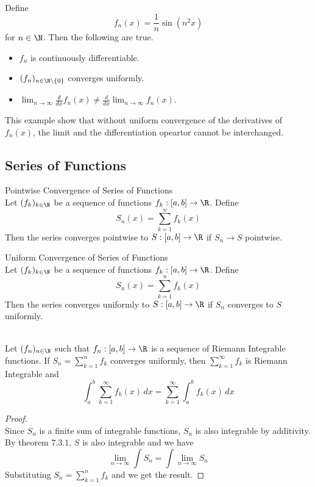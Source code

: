 \documentclass[a4paper]{article}
\begin{document}
\begin{eg}{}{}\\ Define $$f_n(x)=\frac{1}{n}\sin(n^2x)$$ for $n\in\N$. Then the following are true. 
\begin{itemize}
\item $f_n$ is continuously differentiable. 
\item $(f_n)_{n\in\N\setminus\{0\}}$ converges uniformly. 
\item $\lim_{n\to\infty}\frac{d}{dx}f_n(x)\neq\frac{d}{dx}\lim_{n\to\infty}f_n(x)$. 
\end{itemize}
This example show that without uniform convergence of the derivatives of $f_n(x)$, the limit and the differentiation opeartor cannot be interchanged. 
\end{eg}

\subsection{Series of Functions}
\begin{defn}{Pointwise Convergence of Series of Functions}{}\\ Let $(f_k)_{k\in\N}$ be a sequence of functions $f_k:[a,b]\to\R$. Define $$S_n(x)=\sum_{k=1}^nf_k(x)$$ Then the series converges pointwise to $S:[a,b]\to\R$ if $S_n\to S$ pointwise. 
\end{defn}

\begin{defn}{Uniform Convergence of Series of Functions}{}\\ Let $(f_k)_{k\in\N}$ be a sequence of functions $f_k:[a,b]\to\R$. Define $$S_n(x)=\sum_{k=1}^nf_k(x)$$ Then the series converges uniformly to $S:[a,b]\to\R$ if $S_n$ converges to $S$ uniformly.  
\end{defn}

\begin{thm}{}{}\\ Let $(f_n)_{n\in\N}$ such that $f_n:[a,b]\to\R$ is a sequence of Riemann Integrable functions. If $S_n=\sum_{k=1}^nf_k$ converges uniformly, then $\sum_{k=1}^\infty f_k$ is Riemann Integrable and $$\int_a^b\sum_{k=1}^\infty f_k(x)\,dx=\sum_{k=1}^\infty\int_a^bf_k(x)\,dx$$ 
\begin{proof}\\ Since $S_n$ is a finite sum of integrable functions, $S_n$ is also integrable by additivity. By theorem $7.3.1$, $S$ is also integrable and we have $$\lim_{n\to\infty}\int S_n=\int\lim_{n\to\infty}S_n$$ Substituting $S_n=\sum_{k=1}^nf_k$ and we get the result. 
\end{proof}
\end{thm}
\end{document}
